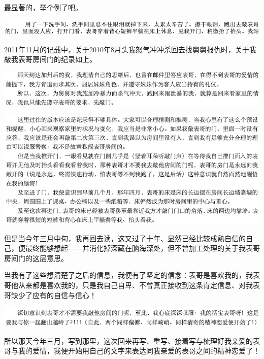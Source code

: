 \documentclass[9pt, b5paper]{article}
\begin{document}
最显著的，举个例了吧。

\begin{center}
\includegraphics[width=.9\linewidth]{./pic/backups_plans_20210426_161140.png}
\end{center}

2011年11月的记载中，关于2010年8月头我怒气冲冲杀回去找舅舅报仇时，关于我敲我表哥房间门的纪录如上。 

\begin{center}
\includegraphics[width=.9\linewidth]{./pic/backups_plans_20210426_161859.png}
\end{center}

\begin{center}
\includegraphics[width=.9\linewidth]{./pic/backups_plans_20210426_161924.png}
\end{center}

但是当今年三月中旬，我再回去读，这又过了十年、显然已经比较成熟自信的自己，便最终能够想起——并消化掉深藏在脑海深处，但不曾加工处理的关于我表哥房间门的这层意思。

当我有了这些想清楚了之后的信息，我便有了坚定的信念：表哥是喜欢我的，我表哥他从来都是喜欢我的，只是我自己自卑、不曾真正接收到这条肯定信息、对我表哥缺少了应有的自信与信心！

\begin{center}
\includegraphics[width=.9\linewidth]{./pic/backups_plans_20210426_162149.png}
\end{center}

所以那天今年三月，写到那里，这次回来再写、重写、接着写与梳理好我亲爱的表哥与我的爱情，我便开始用自己的文字来表达同我亲爱的表哥之间的精神恋爱了！
\end{document}
